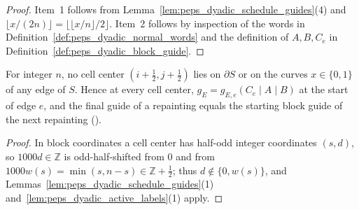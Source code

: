 \begin{proof}\leanok
    Item~1 follows from Lemma~\ref{lem:peps_dyadic_schedule_guides}(4) and
    $\lfloor x/(2n)\rfloor=\lfloor\lfloor x/n\rfloor/2\rfloor$. Item~2 follows
    by inspection of the words in Definition~\ref{def:peps_dyadic_normal_words}
    and the definition of $A,B,C_e$ in Definition~\ref{def:peps_dyadic_block_guide}.
\end{proof}

\begin{lemma}
    \label{lem:peps_dyadic_sites}
    \leanok
    For integer $n$, no cell center $(i+\tfrac12,j+\tfrac12)$ lies on $\partial S$
    or on the curves $x\in\{0,1\}$ of any edge of $S$. Hence at every cell center,
    $g_E=g_{E,e}(C_e\mid A\mid B)$ at the start of edge $e$, and the final guide
    of a repainting equals the starting block guide of the next repainting
    (\cite[Section~7, lines 62--80]{OpenAI2026PolynomialPEPS}).
\end{lemma}

\begin{proof}\leanok
    In block coordinates a cell center has half-odd integer coordinates $(s,d)$, so
    $1000d\in\mathbb Z$ is odd-half-shifted from $0$ and from
    $1000w(s)=\min(s,n-s)\in\mathbb Z+\tfrac12$; thus $d\notin\{0,w(s)\}$, and
    Lemmas~\ref{lem:peps_dyadic_schedule_guides}(1)
    and~\ref{lem:peps_dyadic_active_labels}(1) apply.
\end{proof}

